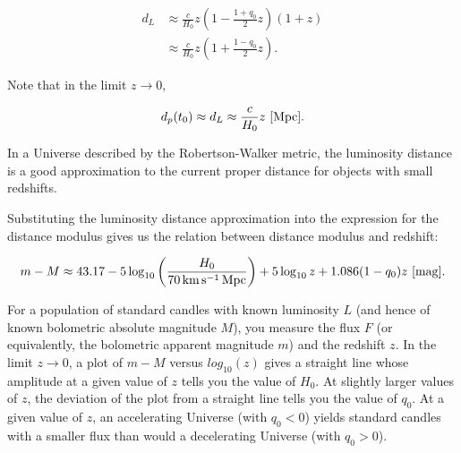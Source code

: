 \documentclass[a4paper,11pt]{article}
\begin{document}
\begin{align*}
    d_L &\approx \frac{c}{H_0}z \left(1-\frac{1+q_0}{2}z\right)(1+z) \\
        & \approx \frac{c}{H_0}z \left(1+\frac{1-q_0}{2}z\right).
\end{align*}

{\noindent}Note that in the limit $z\rightarrow0$,

\begin{align*}
    d_p(t_0) \approx d_L \approx \frac{c}{H_0}z ~ [{\rm Mpc}].
\end{align*}

{\noindent}In a Universe described by the Robertson-Walker metric, the luminosity distance is a good approximation to the current proper distance for objects with small redshifts.

{\noindent}Substituting the luminosity distance approximation into the expression for the distance modulus gives us the relation between distance modulus and redshift:

\begin{align*}
    m - M \approx 43.17 - 5\log_{10} \left(\frac{H_0}{70\,{\rm km\,s^{-1}\,Mpc}}\right) + 5\log_{10}z + 1.086(1-q_0)z ~ [{\rm mag}].
\end{align*}

{\noindent}For a population of standard candles with known luminosity $L$ (and hence of known bolometric absolute magnitude $M$), you measure the flux $F$ (or equivalently, the bolometric apparent magnitude $m$) and the redshift $z$. In the limit $z\rightarrow0$, a plot of $m − M$ versus $log_{10}(z)$ gives a straight line whose amplitude at a given value of $z$ tells you the value of $H_0$. At slightly larger values of $z$, the deviation of the plot from a straight line tells you the value of $q_0$. At a given value of $z$, an accelerating Universe (with $q_0<0$) yields standard candles with a smaller flux than would a decelerating Universe (with $q_0>0$).
\end{document}

